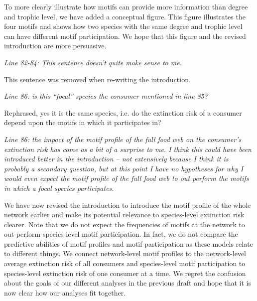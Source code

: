 \documentclass[12pt]{article}
\newcommand{\us}{\rm \setlength{\leftskip}{0.3cm} \setlength{\rightskip}{0.3cm}}
\newcommand{\them}{\it \setlength{\leftskip}{0cm} \setlength{\rightskip}{0cm}}
\begin{document}
        
        To more clearly illustrate how motifs can provide more information than degree and trophic level, we have added a conceptual figure. This figure illustrates the four motifs and shows how two species with the same degree and trophic level can have different motif participation. We hope that this figure and the revised introduction are more persuasive.
        
        
        \them
        Line 82-84: This sentence doesn’t quite make sense to me.
        
        \us
        This sentence was removed when re-writing the introduction.
        
        \them
        Line 86: is this “focal” species the consumer mentioned in line 85?
        
        \us
        Rephrased, yes it is the same species, i.e. do the extinction risk of a consumer depend upon the motifs in which it participates in?
        
        \them
        Line 86: the impact of the motif profile of the full food web on the consumer’s extinction risk has come as a bit of a surprise to me. I think this could have been introduced better in the introduction – not extensively because I think it is probably a secondary question, but at this point I have no hypotheses for why I would even expect the motif profile of the full food web to out perform the motifs in which a focal species participates.
        
        \us
        We have now revised the introduction to introduce the motif profile of the whole network earlier and make its potential relevance to species-level extinction risk clearer.
        Note that we do not expect the frequencies of motifs at the network to out-perform species-level motif participation. In fact, we do not compare the predictive abilities of motif profiles and motif participation as these models relate to different things. We connect network-level motif profiles to the network-level average extinction risk of all consumers and species-level motif participation to species-level extinction risk of one consumer at a time. We regret the confusion about the goals of our different analyses in the previous draft and hope that it is now clear how our analyses fit together.
        
\end{document}
